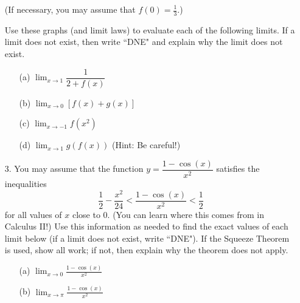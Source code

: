 \documentclass[10pt, oneside]{amsart}
\begin{document}
\begin{enumerate}[leftmargin=0pt]
\begin{multicols}{2}
\begin{enumerate}

\end{enumerate}
\end{multicols}

(If necessary, you may assume that $f(0)=\frac{1}{3}$.)

Use these graphs (and limit laws) to evaluate each of the following limits. If a limit does not exist, then write ``DNE" and explain why the limit does not exist. 

\begin{enumerate}

\item[(a)] $\displaystyle\lim_{x\to 1} \dfrac{1}{2+f(x)}$

\vfill

\item[(b)] $\displaystyle\lim_{x\to 0}[f(x)+g(x)]$

\vfill

\item[(c)] $\displaystyle\lim_{x\to -1} f(x^2)$

\vfill

\item[(d)] $\displaystyle\lim_{x\to 1} g(f(x))$  (Hint: Be careful!)

\vfill

\end{enumerate}

\newpage


\item[3.] You may assume that the function $y=\dfrac{1-\cos(x)}{x^2}$ satisfies the inequalities
$$\frac{1}{2}-\frac{x^2}{24}<\frac{1-\cos(x)}{x^2}<\frac{1}{2}$$
for all values of $x$ close to $0$. (You can learn where this comes from in Calculus II!) Use this information as needed to find the exact values of each limit below (if a limit does not exist, write ``DNE"). If the Squeeze Theorem is used, show all work; if not, then explain why the theorem does not apply.

\begin{enumerate}

\item[(a)] $\displaystyle\lim_{x\to 0}\frac{1-\cos(x)}{x^2}$

\vfill

\item[(b)] $\displaystyle\lim_{x\to \pi}\frac{1-\cos(x)}{x^2}$

\vfill

\end{enumerate}


\end{enumerate}
\end{document}
